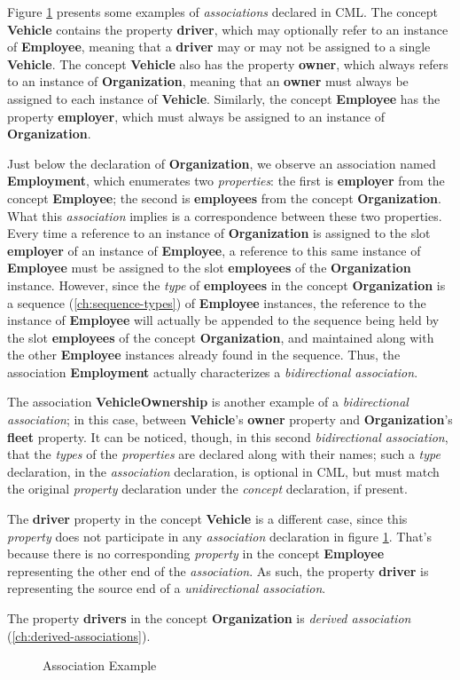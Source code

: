 Figure \ref{fig:ex:associations} presents some examples of \emph{associations} declared in CML.
The concept \textbf{Vehicle} contains the property \textbf{driver},
which may optionally refer to an instance of \textbf{Employee},
meaning that a \textbf{driver} may or may not be assigned to a single \textbf{Vehicle}.
The concept \textbf{Vehicle} also has the property \textbf{owner},
which always refers to an instance of \textbf{Organization},
meaning that an \textbf{owner} must always be assigned to each instance of \textbf{Vehicle}. 
Similarly,
the concept \textbf{Employee} has the property \textbf{employer},
which must always be assigned to an instance of \textbf{Organization}.

Just below the declaration of \textbf{Organization},
we observe an association named \textbf{Employment},
which enumerates two \emph{properties}:
the first is \textbf{employer} from the concept \textbf{Employee};
the second is \textbf{employees} from the concept \textbf{Organization}.
What this \emph{association} implies is a correspondence between these two properties.
Every time a reference to an instance of \textbf{Organization} is assigned to
the slot \textbf{employer} of an instance of \textbf{Employee},
a reference to this same instance of \textbf{Employee} must be assigned to
the slot \textbf{employees} of the \textbf{Organization} instance.
However,
since the \emph{type} of \textbf{employees}
in the concept \textbf{Organization}
is a sequence (\ref{ch:sequence-types}) of \textbf{Employee} instances,
the reference to the instance of \textbf{Employee} will actually be appended to the sequence
being held by the slot \textbf{employees} of the concept \textbf{Organization},
and maintained along with the other \textbf{Employee} instances already found in the sequence.
Thus, the association \textbf{Employment} actually characterizes a \emph{bidirectional association}.

The association \textbf{VehicleOwnership} is another example of a \emph{bidirectional association};
in this case,
between \textbf{Vehicle}'s \textbf{owner} property and \textbf{Organization}'s \textbf{fleet} property.
It can be noticed, though, 
in this second \emph{bidirectional association},
that the \emph{types} of the \emph{properties} are declared along with their names;
such a \emph{type} declaration,
in the \emph{association} declaration,
is optional in CML,
but must match the original \emph{property} declaration under the \emph{concept} declaration,
if present.

The \textbf{driver} property in the concept \textbf{Vehicle} is a different case,
since this \emph{property} does not participate in any \emph{association} declaration
in figure \ref{fig:ex:associations}.
That's because there is no corresponding \emph{property} in the concept \textbf{Employee}
representing the other end of the \emph{association}.
As such, the property \textbf{driver} is representing the source end of a \emph{unidirectional association}.

The property \textbf{drivers} in the concept \textbf{Organization}
is \emph{derived association} (\ref{ch:derived-associations}).

\begin{figure}
\verbatimfont{\small}

\caption{Association Example}
\label{fig:ex:associations}
\end{figure}

